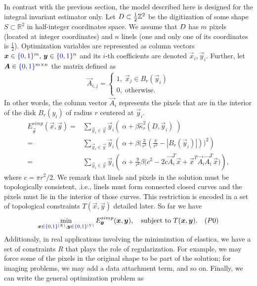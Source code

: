 In contrast with the previous section, the model described here is designed for the integral invariant estimator only. Let $D \subset \frac{1}{2}\mathbb{Z}^2$ be the digitization of some shape $S \subset \mathbb{R}^2$ %
 in half-integer coordinates space. We assume that $D$ has $m$ pixels (located at integer coordinates) and $n$ linels (one and only one of its coordinates is $\frac{1}{2}$). Optimization variables are represented as column vectors $\bm{x} \in {\color{blue}{\{0,1\}}}^{m},\, \bm{y} \in {\color{blue}{\{0,1\}}}^{n}$ and its $i$-th coefficients are denoted  $\vec{x}_i,\vec{y}_i$.  Further, let $\bm{A} \in {\color{blue}{\{0,1\}}}^{m\times n}$ the matrix defined as
\begin{align*}
	\vec{A}_{i,j} = \left\{ \begin{array}{ll}
		1,\; \vec{x}_j \in B_{r}(\vec{y}_i)\\
		0,\; \text{otherwise}.
	\end{array}\right.
\end{align*}
%
In other words, the column vector $\vec{A}_i$ represents the pixels that are in the interior of the disk $B_{r}(y_i)$ of radius $r$ centered at $\vec{y}_i$. 
\begin{align}
	E_{\vec{\theta}}^{simp}(\vec{x},\vec{y}) =& \sum_{\vec{y}_i \in \vec{y}}{ \vec{y}_i \left(\; \alpha + \beta \hat{\kappa}_{r}^2(D,\vec{y}_i) \; \right)}\\\nonumber
			   =& \sum_{\vec{y}_i \in \vec{y}}{ \vec{y}_i \left(\; \alpha  + \beta \big( \frac{3}{r^3}(\frac{\pi}{r^2} - |B_r(\vec{y}_i)|)\big)^2\right)}\\\nonumber
			   =& \sum_{\vec{y}_i \in \vec{y}}{ \vec{y}_i \left(\; \alpha + \frac{9}{r^6}\beta \big(c^2 - 2c\vec{A}_i^T\vec{x} + \vec{x}^T\vec{A}_i\vec{A}_i^T\vec{x}\big)\right)},			   
	\end{align}
%	
where $c =  \pi r^2/2$. We remark that linels and pixels in the solution must be topologically consistent, .i.e., linels must form connected closed curves and the pixels must lie in the interior of those curves. This restriction is encoded in a set of topological constraints $T(\vec{x},\vec{y})$ detailed later. So far we have
\begin{align*}
	\min_{\bm{x} \in {\color{blue}{\{0,1\}}}^{|X|}, \bm{y} \in {\color{blue}{\{0,1\}}}^{|Y|}}{E_{\bm{\theta}}^{simp}(\bm{x},\bm{y})}, \quad \text{subject to } T(\bm{x},\bm{y}). \quad (P0)
\end{align*}
%
Additionaly, in real applications involving the minimization of elastica, we have a set of constraints $R$ that plays the role of regularization. For example, we may force some of the pixels in the original shape to be part of the solution; for imaging problems, we may add a data attachment term, and so on. Finally, we can write the general optimization problem as
